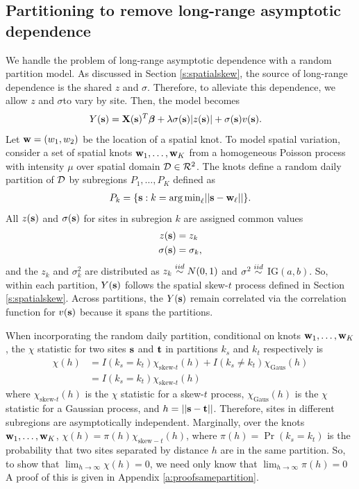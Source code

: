 \documentclass[11pt]{article}
\begin{document}
\subsection{Partitioning to remove long-range asymptotic dependence}\label{s:part}
We handle the problem of long-range asymptotic dependence with a random partition model.
As discussed in Section \ref{s:spatialskew}, the source of long-range dependence is the shared $z$ and $\sigma$.
Therefore, to alleviate this dependence, we allow $z$ and $\sigma$to vary by site.
Then, the model becomes
\begin{align} \label{eq:partition}
  Y(\mbox{\bf s}) &= \mbox{\bf X}(\mbox{\bf s})^T \mbox{\boldmath $\beta$} + \lambda \sigma(\mbox{\bf s}) |z(\mbox{\bf s})| + \sigma(\mbox{\bf s}) v(\mbox{\bf s}).
\end{align}
Let $\mbox{\bf w} = (w_1, w_2)$ be the location of a spatial knot.
To model spatial variation, consider a set of spatial knots $\mbox{\bf w}_1, \ldots, \mbox{\bf w}_K$ from a homogeneous Poisson process with intensity $\mu$ over spatial domain ${\cal D} \in {\cal R}^2$.
The knots define a random daily partition of ${\cal D}$ by subregions $P_{1}, \ldots, P_{K}$ defined as
\begin{align*}
  P_{k} = \{ \mbox{\bf s} : k = {\mathop{\rm arg\, min}}_\ell || \mbox{\bf s} - \mbox{\bf w}_{\ell} || \}.
\end{align*}
All $z(\mbox{\bf s})$ and $\sigma(\mbox{\bf s})$ for sites in subregion $k$ are assigned common values
\begin{align}
  z(\mbox{\bf s}) &= z_{k} \label{eq:sitez}\\
  \sigma(\mbox{\bf s}) &= \sigma_{k} \label{eq:sitesig},
\end{align}
and the $z_k$ and $\sigma^2_k$ are distributed as $z_k \stackrel{iid}{\sim} N(0, 1)$ and $\sigma^2 \stackrel{iid}{\sim}$ IG$(a, b)$.
So, within each partition, $Y(\mbox{\bf s})$ follows the spatial skew-$t$ process defined in Section \ref{s:spatialskew}.
Across partitions, the $Y(\mbox{\bf s})$ remain correlated via the correlation function for $v(\mbox{\bf s})$ because it spans the partitions.

When incorporating the random daily partition, conditional on knots $\mbox{\bf w}_1, \ldots, \mbox{\bf w}_K$, the $\chi$ statistic for two sites $\mbox{\bf s}$ and $\mbox{\bf t}$ in partitions $k_s$ and $k_t$ respectively is
\begin{align}
  \chi(h) &= I(k_s = k_t) \chi_{\text{skew-}t}(h) + I(k_s \neq k_t) \chi_{\text{Gaus}}(h) \nonumber \\
         &= I(k_s = k_t) \chi_{\text{skew-}t}(h)
\end{align}
where $\chi_{\text{skew-}t}(h)$ is the $\chi$ statistic for a skew-$t$ process, $\chi_{\text{Gaus}}(h)$ is the $\chi$ statistic for a Gaussian process, and $h = ||\mbox{\bf s} - \mbox{\bf t}||$.
Therefore, sites in different subregions are asymptotically independent.
Marginally, over the knots $\mbox{\bf w}_1, \ldots, \mbox{\bf w}_K$, $\chi(h) = \pi(h) \chi_{\text{skew}-t}(h)$, where $\pi(h) = \Pr(k_s = k_t)$ is the probability that two sites separated by distance $h$ are in the same partition.
So, to show that $\lim_{h \rightarrow \infty} \chi(h) = 0$, we need only know that $\lim_{h \rightarrow \infty} \pi(h) = 0$
A proof of this is given in Appendix \ref{a:proofsamepartition}.
\end{document}
